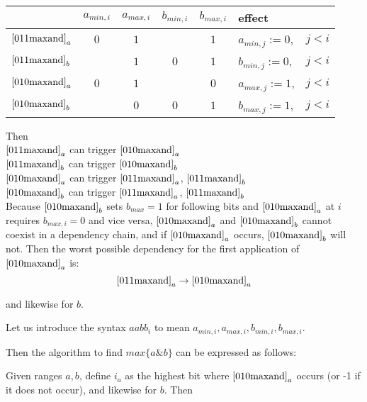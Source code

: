 \documentclass{article}
\begin{document}
\begin{tabular}{l|c|c|c|c|l r}
& $a_{min,i}$ & $a_{max,i}$ & $b_{min,i}$ & $b_{max,i}$ & effect &\\
\hline
$\eqref{011maxand}_a$ & $0$ & $1$ & & $1$ & $a_{min,j} := 0$, \;& $j < i$ \\
\hline
$\eqref{011maxand}_b$ & & $1$ & $0$ & $1$ & $b_{min,j} := 0$, \;& $j < i$ \\
\hline
$\eqref{010maxand}_a$ & $0$ & $1$ & & $0$ & $a_{max,j} := 1$, \;& $j < i$ \\
\hline
$\eqref{010maxand}_b$ & & $0$ & $0$ & $1$ & $b_{max,j} := 1$, \;& $j < i$ \\
\end{tabular}

\vspace{10pt}

Then\\
$\eqref{011maxand}_a$ \quad can trigger \quad $\eqref{010maxand}_a$\\
$\eqref{011maxand}_b$ \quad can trigger \quad $\eqref{010maxand}_b$\\
$\eqref{010maxand}_a$ \quad can trigger \quad $\eqref{011maxand}_a$, $\eqref{011maxand}_b$\\
$\eqref{010maxand}_b$ \quad can trigger \quad $\eqref{011maxand}_a$, $\eqref{011maxand}_b$\\

Because $\eqref{010maxand}_b$ sets $b_{max} = 1$ for following bits
and $\eqref{010maxand}_a$ at $i$ requires $b_{max,i} = 0$ and vice versa,
$\eqref{010maxand}_a$ and $\eqref{010maxand}_b$ cannot coexist in a 
dependency chain, and if $\eqref{010maxand}_a$ occurs, $\eqref{010maxand}_b$ 
will not.
Then the worst possible dependency
for the first application of $\eqref{010maxand}_a$ is:
\begin{equation*} 
\eqref{011maxand}_a \rightarrow \eqref{010maxand}_a
\end{equation*}

and likewise for $b$. 

\vspace{10pt}

Let us introduce the syntax $aabb_i$ to mean 
$a_{min,i},a_{max,i},b_{min,i},b_{max,i}$.

\vspace{10pt}

Then the algorithm to find $max \{a\&b\}$ can be expressed as follows:
\vspace{10pt}

Given ranges $a,b$, define $i_a$ as the highest bit where 
$\eqref{010maxand}_a$ occurs (or -1 if it does not occur), 
and likewise for $b$. Then
\end{document}

